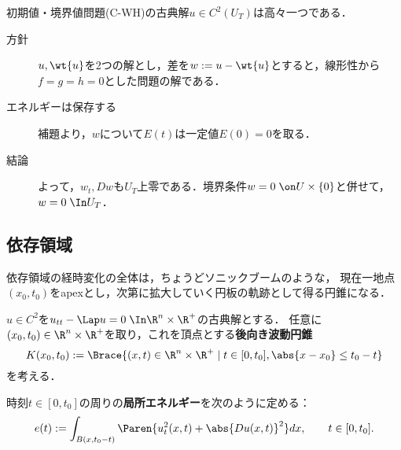 \documentclass[uplatex,dvipdfmx]{jsreport}
\begin{document}
\begin{theorem}[波動方程式の解の一意性]
    初期値・境界値問題(C-WH)の古典解$u\in C^2(U_T)$は高々一つである．
\end{theorem}
\begin{Proof}\mbox{}
    \begin{description}
        \item[方針] $u,\wt{u}$を2つの解とし，差を$w:=u-\wt{u}$とすると，線形性から$f=g=h=0$とした問題の解である．
        \item[エネルギーは保存する] 補題より，$w$について$E(t)$は一定値$E(0)=0$を取る．
        \item[結論] よって，$w_t,Dw$も$U_T$上零である．境界条件$w=0\;\on U\times\{0\}$と併せて，$w=0\;\In U_T$．
    \end{description}
\end{Proof}

\subsection{依存領域}

\begin{tcolorbox}[colframe=ForestGreen, colback=ForestGreen!10!white,breakable,colbacktitle=ForestGreen!40!white,coltitle=black,fonttitle=\bfseries\sffamily,
title=]
    依存領域の経時変化の全体は，ちょうどソニックブームのような，
    現在一地点$(x_0,t_0)$をapexとし，次第に拡大していく円板の軌跡として得る円錐になる．
\end{tcolorbox}

\begin{notation}
    $u\in C^2$を$u_{tt}-\Lap u=0\;\In \R^n\times\R^+$の古典解とする．
    任意に$(x_0,t_0)\in\R^n\times\R^+$を取り，これを頂点とする\textbf{後向き波動円錐}
    \[K(x_0,t_0):=\Brace{(x,t)\in\R^n\times\R^+\mid t\in[0,t_0],\abs{x-x_0}\le t_0-t}\]
    を考える．
\end{notation}

\begin{definition}
    時刻$t\in[0,t_0]$の周りの\textbf{局所エネルギー}を次のように定める：
    \[e(t):=\int_{B(x,t_0-t)}\Paren{u_t^2(x,t)+\abs{Du(x,t)}^2}dx,\qquad t\in[0,t_0].\]
\end{definition}
\end{document}
